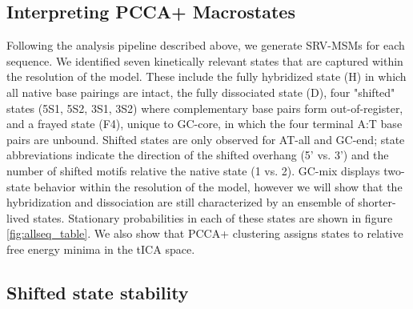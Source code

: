 \documentclass[journal=jpcbfk,manuscript=article]{achemso}
\begin{document}
\subsection{Interpreting PCCA+ Macrostates}

Following the analysis pipeline described above, we generate SRV-MSMs for each sequence. We identified seven kinetically relevant states that are captured within the resolution of the model. These include the fully hybridized state (H) in which all native base pairings are intact, the fully dissociated state (D), four "shifted" states (5S1, 5S2, 3S1, 3S2) where complementary base pairs form out-of-register, and a frayed state (F4), unique to GC-core, in which the four terminal A:T base pairs are unbound. Shifted states are only observed for AT-all and GC-end; state abbreviations indicate the direction of the shifted overhang (5' vs. 3') and the number of shifted motifs relative the native state (1 vs. 2). GC-mix displays two-state behavior within the resolution of the model, however we will show that the hybridization and dissociation are still characterized by an ensemble of shorter-lived states. Stationary probabilities in each of these states are shown in figure \ref{fig:allseq_table}. We also show that PCCA+ clustering assigns states to relative free energy minima in the tICA space.

\subsection{Shifted state stability}
\end{document}
